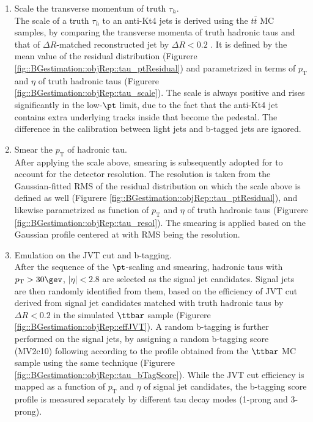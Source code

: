 \begin{enumerate}
\item Scale the transverse momentum of truth $\tau_h$. \\
The scale of a truth $\tau_h$ to an anti-Kt4 jets is derived using the $t\bar{t}$ MC samples, 
by comparing the transverse momenta of truth hadronic taus and that of $\Delta R$-matched reconstructed jet by $\Delta R<0.2$
. It is defined by the mean value of the residual distribution (Figurere \ref{fig::BGestimation::objRep::tau_ptResidual}) and parametrized in terms of $p_{\mathrm{T}}$ and $\eta$ of truth hadronic taus (Figurere \ref{fig::BGestimation::objRep::tau_scale}). The scale is always positive and rises significantly in the low-$\pt$ limit, due to the fact that the anti-Kt4 jet contains extra underlying tracks inside that become the pedestal. The difference in the calibration between light jets and b-tagged jets are ignored. \\


\item Smear the $p_{\mathrm{T}}$ of hadronic tau. \\
After applying the scale above, smearing is subsequently adopted for to account for the detector resolution.
The resolution is taken from the Gaussian-fitted RMS of the residual distribution on which the scale above is defined as well (Figurere \ref{fig::BGestimation::objRep::tau_ptResidual}), and likewise parametrized as function of $p_{\mathrm{T}}$ and $\eta$ of truth hadronic taus (Figurere \ref{fig::BGestimation::objRep::tau_resol}). The smearing is applied based on the Gaussian profile centered at with RMS being the resolution. \\


\item Emulation on the JVT cut and b-tagging.  \\
After the sequence of the $\pt$-scaling and smearing, hadronic taus with $p_{\mathrm{T}}>30\gev$, $|\eta|<2.8$ are selected as the signal jet candidates.
Signal jets are then randomly identified from them, based on the efficiency of JVT cut derived from signal jet candidates matched with truth hadronic taus by $\Delta R<0.2$ in the simulated $\ttbar$ sample (Figurere \ref{fig::BGestimation::objRep::effJVT}). 
A random b-tagging is further performed on the signal jets, by assigning a random b-tagging score (MV2c10) following according to the profile obtained from the $\ttbar$ MC sample using the same technique (Figurere \ref{fig::BGestimation::objRep::tau_bTagScore}). While the JVT cut efficiency is mapped as a function of $p_{\mathrm{T}}$ and $\eta$ of signal jet candidates, the b-tagging score profile is measured separately by different tau decay modes (1-prong and 3-prong).
\end{enumerate}


